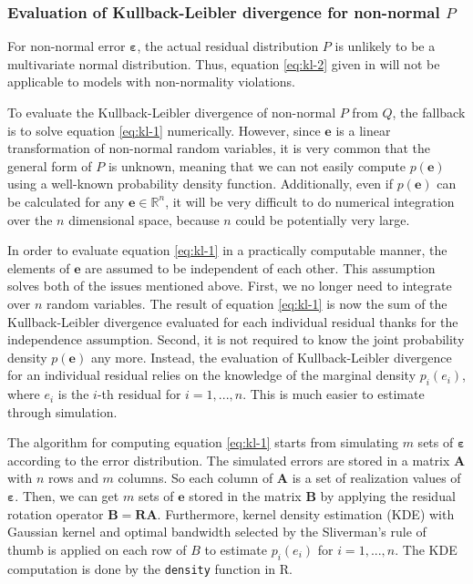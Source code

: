 \documentclass[]{interact}
\theoremstyle{plain}%
\theoremstyle{definition}
\theoremstyle{remark}
\begin{document}
\hypertarget{evaluation-of-kullback-leibler-divergence-for-non-normal-p}{%
\subsubsection{\texorpdfstring{Evaluation of Kullback-Leibler divergence
for non-normal
\(P\)}{Evaluation of Kullback-Leibler divergence for non-normal P}}\label{evaluation-of-kullback-leibler-divergence-for-non-normal-p}}

For non-normal error \(\boldsymbol{\varepsilon}\), the actual residual
distribution \(P\) is unlikely to be a multivariate normal distribution.
Thus, equation \ref{eq:kl-2} given in \citet{li2023plot} will not be
applicable to models with non-normality violations.

To evaluate the Kullback-Leibler divergence of non-normal \(P\) from
\(Q\), the fallback is to solve equation \ref{eq:kl-1} numerically.
However, since \(\boldsymbol{e}\) is a linear transformation of
non-normal random variables, it is very common that the general form of
\(P\) is unknown, meaning that we can not easily compute
\(p(\boldsymbol{e})\) using a well-known probability density function.
Additionally, even if \(p(\boldsymbol{e})\) can be calculated for any
\(\boldsymbol{e} \in \mathbb{R}^n\), it will be very difficult to do
numerical integration over the \(n\) dimensional space, because \(n\)
could be potentially very large.

In order to evaluate equation \ref{eq:kl-1} in a practically computable
manner, the elements of \(\boldsymbol{e}\) are assumed to be independent
of each other. This assumption solves both of the issues mentioned
above. First, we no longer need to integrate over \(n\) random
variables. The result of equation \ref{eq:kl-1} is now the sum of the
Kullback-Leibler divergence evaluated for each individual residual
thanks for the independence assumption. Second, it is not required to
know the joint probability density \(p(\boldsymbol{e})\) any more.
Instead, the evaluation of Kullback-Leibler divergence for an individual
residual relies on the knowledge of the marginal density \(p_i(e_i)\),
where \(e_i\) is the \(i\)-th residual for \(i = 1, ..., n\). This is
much easier to estimate through simulation.

The algorithm for computing equation \ref{eq:kl-1} starts from
simulating \(m\) sets of \(\boldsymbol{\varepsilon}\) according to the
error distribution. The simulated errors are stored in a matrix
\(\boldsymbol{A}\) with \(n\) rows and \(m\) columns. So each column of
\(\boldsymbol{A}\) is a set of realization values of
\(\boldsymbol{\varepsilon}\). Then, we can get \(m\) sets of
\(\boldsymbol{e}\) stored in the matrix \(\boldsymbol{B}\) by applying
the residual rotation operator
\(\boldsymbol{B} = \boldsymbol{R}\boldsymbol{A}\). Furthermore, kernel
density estimation (KDE) with Gaussian kernel and optimal bandwidth
selected by the Sliverman's rule of thumb \citep{silverman2018density}
is applied on each row of \(B\) to estimate \(p_i(e_i)\) for
\(i = 1, ..., n\). The KDE computation is done by the \texttt{density}
function in R.
\end{document}
